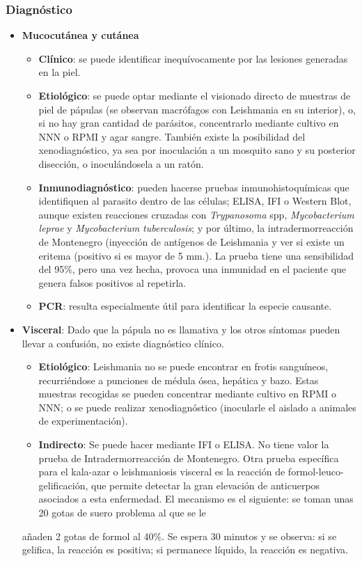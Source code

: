 \subsubsection{Diagnóstico}
\begin{itemize}[itemsep=0pt,parsep=0pt,topsep=0pt,partopsep=0pt] 
	\item \textbf{Mucocutánea y cutánea}
	\begin{itemize}[itemsep=0pt,parsep=0pt,topsep=0pt,partopsep=0pt] 
		\item \textbf{Clínico}: se puede identificar inequívocamente por las lesiones generadas en la piel.
		\item \textbf{Etiológico}: se puede optar mediante el visionado directo de muestras de piel de pápulas (se observan macrófagos con Leishmania en su interior), o, si no hay gran cantidad de parásitos, concentrarlo mediante cultivo en NNN o RPMI y agar sangre. También existe la posibilidad del xenodiagnóstico, ya sea por inoculación a un mosquito sano y su posterior disección, o inoculándosela a un ratón.
		\item \textbf{Inmunodiagnóstico}: pueden hacerse pruebas inmunohistoquímicas que identifiquen  al parasito dentro de las células; ELISA, IFI o Western Blot, aunque existen reacciones cruzadas con \textit{Trypanosoma} spp, \textit{Mycobacterium leprae} y \textit{Mycobacterium tuberculosis}; y por último, la intradermorreacción de Montenegro (inyección de antígenos de Leishmania y ver si existe un eritema (positivo si es mayor de 5 mm.). La prueba tiene una sensibilidad del 95\%, pero una vez hecha, provoca una inmunidad en el paciente que genera falsos positivos al repetirla.
		\item \textbf{PCR}: resulta especialmente útil para identificar la especie causante.
	\end{itemize}
	\item \textbf{Visceral}: Dado que la pápula no es llamativa y los otros síntomas pueden llevar a confusión, no existe diagnóstico clínico.
	\begin{itemize}[itemsep=0pt,parsep=0pt,topsep=0pt,partopsep=0pt] 
		\item \textbf{Etiológico}: Leishmania no se puede encontrar en frotis sanguíneos, recurriéndose a punciones de médula ósea, hepática y bazo. Estas muestras recogidas se pueden concentrar mediante cultivo en RPMI o NNN; o se puede realizar xenodiagnóstico (inocularle el aislado a animales de experimentación). 
		\item \textbf{Indirecto}: Se puede hacer mediante IFI o ELISA. No tiene valor la prueba de Intradermorreacción de Montenegro. 
		Otra prueba específica para el kala-azar o leishmaniosis visceral es la reacción de formol-leuco-gelificación, que permite detectar la gran elevación de anticuerpos asociados a esta enfermedad. El mecanismo es el siguiente: se toman unas 20 gotas de suero problema al que se le
	\end{itemize} añaden 2 gotas de formol al 40\%. Se espera 30 minutos y se observa: si se gelifica, la reacción es positiva; si permanece líquido, la reacción es negativa.
\end{itemize}
\newpage
